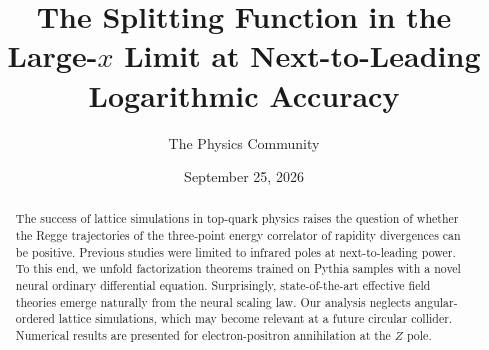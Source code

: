 \documentclass[11pt]{article}
\title{The Splitting Function in the Large-$x$ Limit at Next-to-Leading Logarithmic Accuracy}
\author{The Physics Community}
\date{September 25, 2026}
\numberwithin{equation}{section}
\theoremstyle{definition}
\theoremstyle{remark}
\begin{document}
\maketitle
\begin{abstract}
The success of lattice simulations in top-quark physics raises the
question of whether the Regge trajectories of the three-point energy
correlator of rapidity divergences can be positive. Previous studies
were limited to infrared poles at next-to-leading power. To this end, we
unfold factorization theorems trained on Pythia samples with a novel
neural ordinary differential equation. Surprisingly, state-of-the-art
effective field theories emerge naturally from the neural scaling law.
Our analysis neglects angular-ordered lattice simulations, which may
become relevant at a future circular collider. Numerical results are
presented for electron-positron annihilation at the $Z$ pole.
\end{abstract}
\tableofcontents




\nocite{*}


\end{document}
